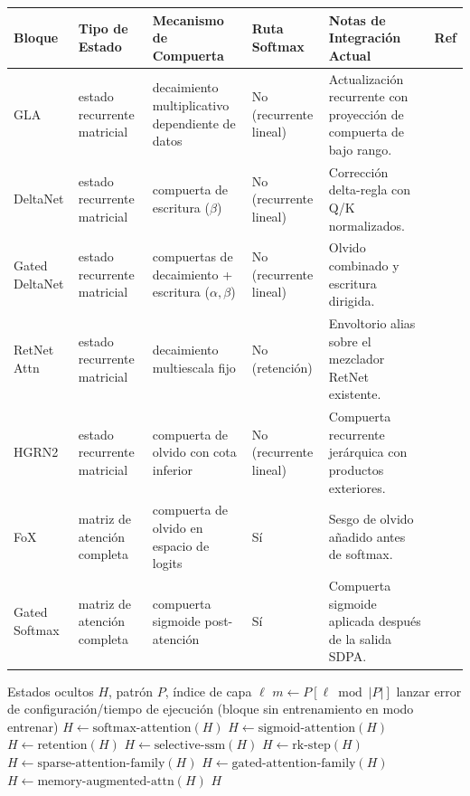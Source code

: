 \documentclass[11pt,a4paper]{article}
\begin{document}
\small
\begin{longtable}{p{2.4cm}p{2.0cm}p{2.2cm}p{1.8cm}p{4.0cm}p{1.5cm}}
\toprule
\textbf{Bloque} & \textbf{Tipo de Estado} & \textbf{Mecanismo de Compuerta} & \textbf{Ruta Softmax} & \textbf{Notas de Integración Actual} & \textbf{Ref} \\
\midrule
\endhead
GLA & estado recurrente matricial & decaimiento multiplicativo dependiente de datos & No (recurrente lineal) & Actualización recurrente con proyección de compuerta de bajo rango. & \citep{yang_gla_2023} \\
DeltaNet & estado recurrente matricial & compuerta de escritura ($\beta$) & No (recurrente lineal) & Corrección delta-regla con Q/K normalizados. & \citep{yang_deltanet_2024} \\
Gated DeltaNet & estado recurrente matricial & compuertas de decaimiento + escritura ($\alpha,\beta$) & No (recurrente lineal) & Olvido combinado y escritura dirigida. & \citep{yang_gated_deltanet_2024} \\
RetNet Attn & estado recurrente matricial & decaimiento multiescala fijo & No (retención) & Envoltorio alias sobre el mezclador RetNet existente. & \citep{sun_retentive_2023} \\
HGRN2 & estado recurrente matricial & compuerta de olvido con cota inferior & No (recurrente lineal) & Compuerta recurrente jerárquica con productos exteriores. & \citep{qin_hgrn2_2024} \\
FoX & matriz de atención completa & compuerta de olvido en espacio de logits & Sí & Sesgo de olvido añadido antes de softmax. & \citep{lin_forgetting_transformer_2025} \\
Gated Softmax & matriz de atención completa & compuerta sigmoide post-atención & Sí & Compuerta sigmoide aplicada después de la salida SDPA. & \citep{qiu_gated_attention_2025} \\
\bottomrule
\end{longtable}
\normalsize

\begin{algorithm}[t]
\caption{Paso Adelante del Mezclador Guiado por Patrón (Conceptual)}
\begin{algorithmic}[1]
\Require Estados ocultos $H$, patrón $P$, índice de capa $\ell$
\State $m \gets P[\ell \bmod |P|]$
    \State lanzar error de configuración/tiempo de ejecución (bloque sin entrenamiento en modo entrenar)
    \State $H \gets \text{softmax-attention}(H)$
    \State $H \gets \text{sigmoid-attention}(H)$
    \State $H \gets \text{retention}(H)$
    \State $H \gets \text{selective-ssm}(H)$
    \State $H \gets \text{rk-step}(H)$
    \State $H \gets \text{sparse-attention-family}(H)$
    \State $H \gets \text{gated-attention-family}(H)$
\Else
    \State $H \gets \text{memory-augmented-attn}(H)$
\EndIf
\State \Return $H$
\end{algorithmic}
\end{algorithm}
\end{document}
